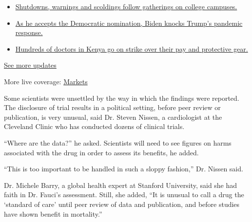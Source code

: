 \begin{itemize}
\tightlist
\item
  \href{https://www.nytimes3xbfgragh.onion/2020/08/21/world/covid-19-coronavirus.html?action=click\&pgtype=Article\&state=default\&region=MAIN_CONTENT_1\&context=storylines_live_updates\#link-4690b6aa}{Shutdowns,
  warnings and scoldings follow gatherings on college campuses.}
\item
  \href{https://www.nytimes3xbfgragh.onion/2020/08/21/world/covid-19-coronavirus.html?action=click\&pgtype=Article\&state=default\&region=MAIN_CONTENT_1\&context=storylines_live_updates\#link-324af071}{As
  he accepts the Democratic nomination, Biden knocks Trump's pandemic
  response.}
\item
  \href{https://www.nytimes3xbfgragh.onion/2020/08/21/world/covid-19-coronavirus.html?action=click\&pgtype=Article\&state=default\&region=MAIN_CONTENT_1\&context=storylines_live_updates\#link-35890b73}{Hundreds
  of doctors in Kenya go on strike over their pay and protective gear.}
\end{itemize}

\href{https://www.nytimes3xbfgragh.onion/2020/08/21/world/covid-19-coronavirus.html?action=click\&pgtype=Article\&state=default\&region=MAIN_CONTENT_1\&context=storylines_live_updates}{See
more updates}

More live coverage:
\href{https://www.nytimes3xbfgragh.onion/live/2020/08/20/business/stock-market-today-coronavirus?action=click\&pgtype=Article\&state=default\&region=MAIN_CONTENT_1\&context=storylines_live_updates}{Markets}

Some scientists were unsettled by the way in which the findings were
reported. The disclosure of trial results in a political setting, before
peer review or publication, is very unusual, said Dr. Steven Nissen, a
cardiologist at the Cleveland Clinic who has conducted dozens of
clinical trials.

``Where are the data?'' he asked. Scientists will need to see figures on
harms associated with the drug in order to assess its benefits, he
added.

``This is too important to be handled in such a sloppy fashion,'' Dr.
Nissen said.

Dr. Michele Barry, a global health expert at Stanford University, said
she had faith in Dr. Fauci's assessment. Still, she added, ``It is
unusual to call a drug the `standard of care' until peer review of data
and publication, and before studies have shown benefit in mortality.''

